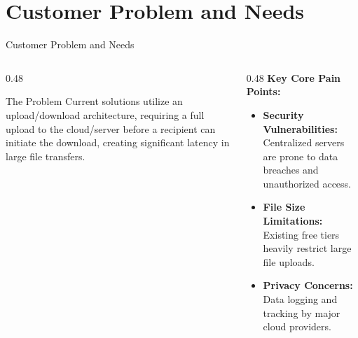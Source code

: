 \documentclass[aspectratio=169]{beamer}
\begin{document}
\section{Customer Problem and Needs}
\begin{frame}{Customer Problem and Needs}
    \begin{columns}
        \begin{column}{0.48\textwidth}
            \begin{block}{The Problem}
                Current solutions utilize an upload/download architecture, requiring a full upload to the cloud/server before a recipient can initiate the download, creating significant latency in large file transfers.
            \end{block}
        \end{column}

        \begin{column}{0.48\textwidth}
            \small
            \vspace{0.2cm}
            \textbf{Key Core Pain Points:}
            \vspace{0.2cm}
            \begin{itemize}
                \item \textbf{Security Vulnerabilities:} Centralized servers are prone to data breaches and unauthorized access.
                \item \textbf{File Size Limitations:} Existing free tiers heavily restrict large file uploads.
                \item \textbf{Privacy Concerns:} Data logging and tracking by major cloud providers.
            \end{itemize}
        \end{column}
    \end{columns}
\end{frame}

\end{document}
